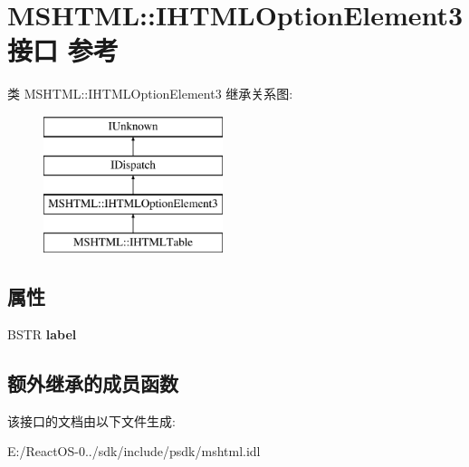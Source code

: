 \hypertarget{interface_m_s_h_t_m_l_1_1_i_h_t_m_l_option_element3}{}\section{M\+S\+H\+T\+ML\+:\+:I\+H\+T\+M\+L\+Option\+Element3接口 参考}
\label{interface_m_s_h_t_m_l_1_1_i_h_t_m_l_option_element3}
类 M\+S\+H\+T\+ML\+:\+:I\+H\+T\+M\+L\+Option\+Element3 继承关系图\+:\begin{figure}[H]
\begin{center}
\leavevmode
\includegraphics[height=4.000000cm]{interface_m_s_h_t_m_l_1_1_i_h_t_m_l_option_element3}
\end{center}
\end{figure}
\subsection*{属性}
\begin{DoxyCompactItemize}
\item 
\mbox{\label{interface_m_s_h_t_m_l_1_1_i_h_t_m_l_option_element3_a96785d2462cdb771c9fc2bdd62a5c5f4}} 
B\+S\+TR {\bfseries label}
\end{DoxyCompactItemize}
\subsection*{额外继承的成员函数}


该接口的文档由以下文件生成\+:\begin{DoxyCompactItemize}
\item 
E\+:/\+React\+O\+S-\/0../sdk/include/psdk/mshtml.\+idl\end{DoxyCompactItemize}
